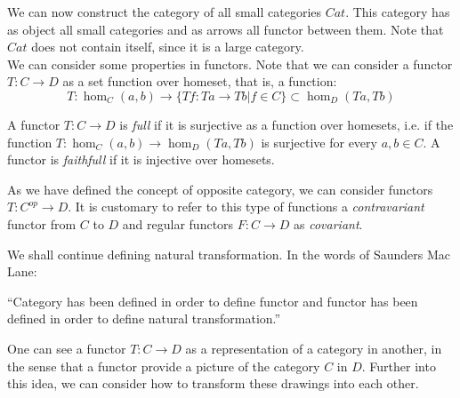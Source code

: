 We can now construct the category of all small categories $Cat$. This category has as object all small categories and as arrows all functor between them. Note that $Cat$ does not contain itself, since it is a large category.\\

We can consider some properties in functors. Note that we can consider a functor $T:C\to D$ as a set function over homeset, that is, a function: 
$$T:\hom_C(a,b) \to \{Tf: Ta \to Tb | f \in C\} \subset \hom_D(Ta,Tb)$$

\begin{definition}
  A functor $T:C\to D$ is \emph{full} if it is surjective as a function over homesets, i.e. if the function $T:\hom_C(a,b) \to  \hom_D(Ta,Tb)$  is surjective for every $a,b \in C$. A functor is \emph{faithfull} if it is injective over homesets.
\end{definition}

As we have defined the concept of opposite category, we can consider functors $T:C^{op} \to D$. It is customary to refer to this type of functions a \emph{contravariant} functor from $C$ to $D$ and regular functors $F:C\to D$ as \emph{covariant}.





We shall continue defining natural transformation. In the words of Saunders Mac Lane:

\begin{displayquote}
  ``Category has been defined in order to define functor and functor has been defined in order to define natural transformation.''
\end{displayquote}




One can see a functor $T:C\to D$ as a representation of a category in another, in the sense that a functor provide a picture of the category $C$ in $D$. Further into this idea, we can consider how to transform these drawings into each other. 

